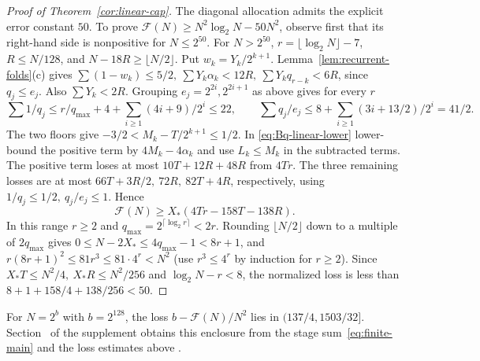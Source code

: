 \begin{proof}[Proof of Theorem~\ref{cor:linear-cap}]
The diagonal allocation admits the explicit error constant \(50\). To prove \(\mathcal F(N)\ge N^2\log_2N-50N^2\), observe first that its right-hand side is nonpositive for \(N\le2^{50}\). For \(N>2^{50}\), \(r=\lfloor\log_2N\rfloor-7\), \(R\le N/128\), and \(N-18R\ge\lfloor N/2\rfloor\). Put \(w_k=Y_k/2^{k+1}\). Lemma~\ref{lem:recurrent-folds}(c) gives \(\sum(1-w_k)\le5/2,\ \sum Y_k\alpha_k<12R,\ \sum Y_k q_{r-k}<6R\), since \(q_j\le e_j\). Also \(\sum Y_k<2R\). Grouping \(e_j=2^{2i},2^{2i+1}\) as above gives for every \(r\)
\[
 \sum 1/q_j\le r/q_{\max}+4+\sum_{i\ge1}(4i+9)/2^i\le22,\qquad
 \sum q_j/e_j\le8+\sum_{i\ge1}(3i+13/2)/2^i=41/2 .
\]
The two floors give \(-3/2<M_k-T/2^{k+1}\le1/2\). In \eqref{eq:Bq-linear-lower} lower-bound the positive term by \(4M_k-4\alpha_k\) and use \(L_k\le M_k\) in the subtracted terms. The positive term loses at most \(10T+12R+48R\) from \(4Tr\). The three remaining losses are at most \(66T+3R/2,\ 72R,\ 82T+4R\), respectively, using \(1/q_j\le1/2,\ q_j/e_j\le1\). Hence
\[
 \mathcal F(N)\ge X_*(4Tr-158T-138R).
\]
In this range \(r\ge2\) and \(q_{\max}=2^{\lceil\log_2 r\rceil}<2r\). Rounding \(\lfloor N/2\rfloor\) down to a multiple of \(2q_{\max}\) gives \(0\le N-2X_*\le4q_{\max}-1<8r+1\), and \(r(8r+1)^2\le81r^3\le81\cdot4^r<N^2\) (use \(r^3\le4^r\) by induction for \(r\ge2\)). Since \(X_*T\le N^2/4,\ X_*R\le N^2/256\) and \(\log_2N-r<8\), the normalized loss is less than \(8+1+158/4+138/256<50\).

\end{proof}

For \(N=2^b\) with \(b=2^{128}\), the loss \(b-\mathcal F(N)/N^2\) lies in \((137/4,1503/32]\). Section~ of the supplement obtains this enclosure from the stage sum~\eqref{eq:finite-main} and the loss estimates above \cite{LuElectronic}.

